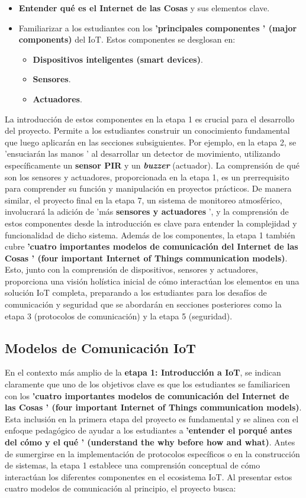 \documentclass{report}
\begin{document}
\begin{itemize}
    \item \textbf{Entender qué es el Internet de las Cosas} y sus elementos clave.
    \item Familiarizar a los estudiantes con los \textbf{ 'principales componentes ' (major components)} del IoT. Estos componentes se desglosan en:
    \begin{itemize}
        \item \textbf{Dispositivos inteligentes (smart devices)}.
        \item \textbf{Sensores}.
        \item \textbf{Actuadores}.
    \end{itemize}
\end{itemize}
La introducción de estos componentes en la etapa 1 es crucial para el desarrollo del proyecto. Permite a los estudiantes construir un conocimiento 
fundamental que luego aplicarán en las secciones subsiguientes. Por ejemplo, en la etapa 2, se  'ensuciarán las manos ' al desarrollar un detector de 
movimiento, utilizando específicamente un \textbf{sensor PIR} y un \textbf{\textit{buzzer}} (actuador). La comprensión 
de qué son los sensores y actuadores, proporcionada en la etapa 1, es un prerrequisito para comprender su función y manipulación en proyectos prácticos. 
De manera similar, el proyecto final en la etapa 7, un sistema de monitoreo atmosférico, involucrará la adición de  'más \textbf{sensores y actuadores} ', 
y la comprensión de estos componentes desde la introducción es clave para entender la complejidad y funcionalidad de dicho sistema. Además de los componentes, 
la etapa 1 también cubre \textbf{ 'cuatro importantes modelos de comunicación del Internet de las Cosas ' (four important Internet of Things communication 
models)}. Esto, junto con la comprensión de dispositivos, sensores y actuadores, proporciona una visión holística inicial de cómo interactúan los 
elementos en una solución IoT completa, preparando a los estudiantes para los desafíos de comunicación y seguridad que se abordarán en secciones 
posteriores como la etapa 3 (protocolos de comunicación) y la etapa 5 (seguridad).

\subsection{Modelos de Comunicación IoT}
En el contexto más amplio de la \textbf{etapa 1: Introducción a IoT}, se  indican claramente que uno de los objetivos clave es que los estudiantes 
se familiaricen con los \textbf{ 'cuatro importantes modelos de comunicación del Internet de las Cosas ' (four important Internet of Things communication 
models)}. Esta inclusión en la primera etapa del proyecto es fundamental y se alinea con el enfoque pedagógico de ayudar a los estudiantes a 
\textbf{'entender el porqué antes del cómo y el qué ' (understand the why before how and what)}. Antes de sumergirse en la implementación de protocolos 
específicos o en la construcción de sistemas, la etapa 1 establece una comprensión conceptual de cómo interactúan los diferentes componentes en el 
ecosistema IoT. Al presentar estos cuatro modelos de comunicación al principio, el proyecto busca:
\end{document}
